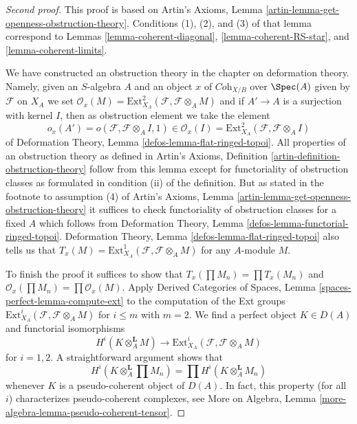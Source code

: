 \begin{proof}[Second proof]
This proof is based on
Artin's Axioms, Lemma \ref{artin-lemma-get-openness-obstruction-theory}.
Conditions (1), (2), and (3) of that lemma correspond to
Lemmas \ref{lemma-coherent-diagonal},
\ref{lemma-coherent-RS-star}, and
\ref{lemma-coherent-limits}.

\medskip\noindent
We have constructed an obstruction theory in the chapter on
deformation theory. Namely, given an $S$-algebra $A$ and an
object $x$ of $\textit{Coh}_{X/B}$ over $\Spec(A)$ given
by $\mathcal{F}$ on $X_A$ we set
$\mathcal{O}_x(M) = \text{Ext}^2_{X_A}(\mathcal{F}, \mathcal{F} \otimes_A M)$
and if $A' \to A$ is a surjection with kernel $I$, then as obstruction
element we take the element
$$
o_x(A') = o(\mathcal{F}, \mathcal{F} \otimes_A I, 1) \in
\mathcal{O}_x(I) = \text{Ext}^2_{X_A}(\mathcal{F}, \mathcal{F} \otimes_A I)
$$
of Deformation Theory, Lemma \ref{defos-lemma-flat-ringed-topoi}.
All properties of an obstruction theory as defined in
Artin's Axioms, Definition \ref{artin-definition-obstruction-theory}
follow from this lemma except for functoriality of obstruction classes
as formulated in condition (ii) of the definition. But as stated in
the footnote to assumption (4) of
Artin's Axioms, Lemma \ref{artin-lemma-get-openness-obstruction-theory}
it suffices to check functoriality of obstruction classes
for a fixed $A$ which follows from
Deformation Theory, Lemma \ref{defos-lemma-functorial-ringed-topoi}.
Deformation Theory, Lemma \ref{defos-lemma-flat-ringed-topoi}
also tells us that
$T_x(M) = \text{Ext}^1_{X_A}(\mathcal{F}, \mathcal{F} \otimes_A M)$
for any $A$-module $M$.

\medskip\noindent
To finish the proof it suffices to show that
$T_x(\prod M_n) = \prod T_x(M_n)$ and
$\mathcal{O}_x(\prod M_n) = \prod \mathcal{O}_x(M)$.
Apply Derived Categories of Spaces, Lemma
\ref{spaces-perfect-lemma-compute-ext}
to the computation of the Ext groups
$\text{Ext}^i_{X_A}(\mathcal{F}, \mathcal{F} \otimes_A M)$
for $i \leq m$ with $m = 2$. We find a perfect object $K \in D(A)$
and functorial isomorphisms
$$
H^i(K \otimes_A^\mathbf{L} M)
\longrightarrow
\text{Ext}^i_{X_A}(\mathcal{F}, \mathcal{F} \otimes_A M)
$$
for $i = 1, 2$. A straightforward argument shows that
$$
H^i(K \otimes_A^\mathbf{L} \prod M_n) =
\prod H^i(K \otimes_A^\mathbf{L} M_n)
$$
whenever $K$ is a pseudo-coherent object of $D(A)$.
In fact, this property (for all $i$) characterizes
pseudo-coherent complexes, see
More on Algebra, Lemma \ref{more-algebra-lemma-pseudo-coherent-tensor}.
\end{proof}

